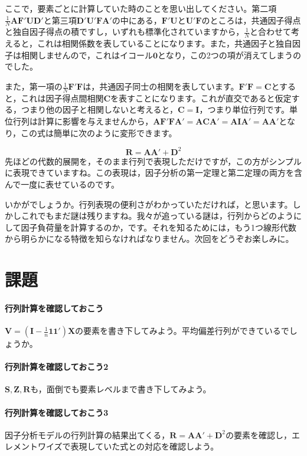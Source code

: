 ここで，要素ごとに計算していた時のことを思い出してください。第二項$\frac{1}{N} \bm{A} \bm{F}'\bm{U} \bm{D}'$と第三項$\bm{D}' \bm{U}' \bm{F} \bm{A}'$の中にある，$\bm{F}' \bm{U}$と$\bm{U}' \bm{F}$のところは，共通因子得点と独自因子得点の積ですし，いずれも標準化されていますから，$\frac{1}{N}$と合わせて考えると，これは相関係数を表していることになります。また，共通因子と独自因子は相関しませんので，これはイコール$\bm{0}$となり，この2つの項が消えてしまうのでした。

また，第一項の$\frac{1}{N}\bm{F} ' \bm{F}$は，共通因子同士の相関を表しています。$\bm{F'F}=\bm{C}$とすると，これは因子得点間相関$\bm{C}$を表すことになります。これが直交であると仮定する，つまり他の因子と相関しないと考えると，$\bm{C} = \bm{I}$，つまり単位行列です。単位行列は計算に影響を与えませんから，$\bm{AF'FA'}=\bm{ACA'}=\bm{AIA'}=\bm{AA'}$となり，この式は簡単に次のように変形できます。

\begin{equation}
	\bm{R} = \bm{A} \bm{A} ' + \bm{D}^2
\end{equation}
先ほどの代数的展開を，そのまま行列で表現しただけですが，この方がシンプルに表現できていますね。この表現は，因子分析の第一定理と第二定理の両方を含んで一度に表せているのです。

いかがでしょうか。行列表現の便利さがわかっていただければ，と思います。しかしこれでもまだ謎は残りますね。我々が追っている謎は，行列からどのようにして因子負荷量を計算するのか，です。それを知るためには，もう1つ線形代数から明らかになる特徴を知らなければなりません。次回をどうぞお楽しみに。
\section{課題}
\paragraph{行列計算を確認しておこう}$ \bm{V} = ( \bm{I} -\frac{1}{n}\bm{1} \bm{1} ')\bm{X} $の要素を書き下してみよう。平均偏差行列ができているでしょうか。
\paragraph{行列計算を確認しておこう2}$ \bm{S},\bm{Z},\bm{R}$も，面倒でも要素レベルまで書き下してみよう。
\paragraph{行列計算を確認しておこう3}因子分析モデルの行列計算の結果出てくる，$\bm{R} = \bm{A} \bm{A} ' + \bm{D}^2$の要素を確認し，エレメントワイズで表現していた式との対応を確認しよう。

